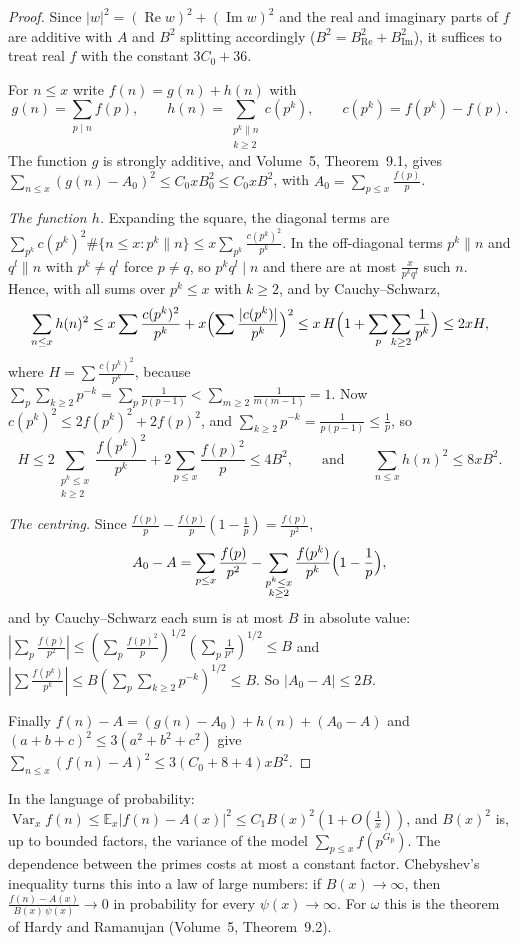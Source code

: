 \begin{proof}
Since $|w|^2=(\operatorname{Re}w)^2+(\operatorname{Im}w)^2$ and the real and imaginary parts of $f$ are additive with $A$ and $B^2$ splitting accordingly ($B^2=B_{\operatorname{Re}}^2+B_{\operatorname{Im}}^2$), it suffices to treat real $f$ with the constant $3C_0+36$.

For $n\le x$ write $f(n)=g(n)+h(n)$ with
\[
g(n)=\sum_{p\mid n}f(p),\qquad h(n)=\sum_{\substack{p^k\parallel n\\k\ge2}}c(p^k),\qquad c(p^k)=f(p^k)-f(p).
\]
The function $g$ is strongly additive, and Volume~5, Theorem~9.1, gives $\sum_{n\le x}(g(n)-A_0)^2\le C_0xB_0^2\le C_0xB^2$, with $A_0=\sum_{p\le x}\frac{f(p)}p$.

\emph{The function $h$.} Expanding the square, the diagonal terms are $\sum_{p^k}c(p^k)^2\#\{n\le x:p^k\parallel n\}\le x\sum_{p^k}\frac{c(p^k)^2}{p^k}$. In the off-diagonal terms $p^k\parallel n$ and $q^l\parallel n$ with $p^k\ne q^l$ force $p\ne q$, so $p^kq^l\mid n$ and there are at most $\frac x{p^kq^l}$ such $n$. Hence, with all sums over $p^k\le x$ with $k\ge2$, and by Cauchy--Schwarz,
\[
\sum_{n\le x}h(n)^2\le x\sum\frac{c(p^k)^2}{p^k}+x\Bigl(\sum\frac{|c(p^k)|}{p^k}\Bigr)^2\le x\,H\Bigl(1+\sum_p\sum_{k\ge2}\frac1{p^k}\Bigr)\le2xH,
\]
where $H=\sum\frac{c(p^k)^2}{p^k}$, because $\sum_p\sum_{k\ge2}p^{-k}=\sum_p\frac1{p(p-1)}<\sum_{m\ge2}\frac1{m(m-1)}=1$. Now $c(p^k)^2\le2f(p^k)^2+2f(p)^2$, and $\sum_{k\ge2}p^{-k}=\frac1{p(p-1)}\le\frac1p$, so
\[
H\le2\sum_{\substack{p^k\le x\\k\ge2}}\frac{f(p^k)^2}{p^k}+2\sum_{p\le x}\frac{f(p)^2}p\le4B^2,\qquad\text{and}\qquad\sum_{n\le x}h(n)^2\le8xB^2.
\]

\emph{The centring.} Since $\frac{f(p)}p-\frac{f(p)}p(1-\frac1p)=\frac{f(p)}{p^2}$,
\[
A_0-A=\sum_{p\le x}\frac{f(p)}{p^2}-\sum_{\substack{p^k\le x\\k\ge2}}\frac{f(p^k)}{p^k}\Bigl(1-\frac1p\Bigr),
\]
and by Cauchy--Schwarz each sum is at most $B$ in absolute value: $|\sum_p\frac{f(p)}{p^2}|\le(\sum_p\frac{f(p)^2}p)^{1/2}(\sum_p\frac1{p^3})^{1/2}\le B$ and $|\sum\frac{f(p^k)}{p^k}|\le B(\sum_p\sum_{k\ge2}p^{-k})^{1/2}\le B$. So $|A_0-A|\le2B$.

Finally $f(n)-A=(g(n)-A_0)+h(n)+(A_0-A)$ and $(a+b+c)^2\le3(a^2+b^2+c^2)$ give $\sum_{n\le x}(f(n)-A)^2\le3(C_0+8+4)xB^2$.
\end{proof}

In the language of probability: $\operatorname{Var}_xf(n)\le\mathbb E_x|f(n)-A(x)|^2\le C_1B(x)^2(1+O(\frac1x))$, and $B(x)^2$ is, up to bounded factors, the variance of the model $\sum_{p\le x}f(p^{G_p})$. The dependence between the primes costs at most a constant factor. Chebyshev's inequality turns this into a law of large numbers: if $B(x)\to\infty$, then $\frac{f(n)-A(x)}{B(x)\,\psi(x)}\to0$ in probability for every $\psi(x)\to\infty$. For $\omega$ this is the theorem of Hardy and Ramanujan (Volume~5, Theorem~9.2).

